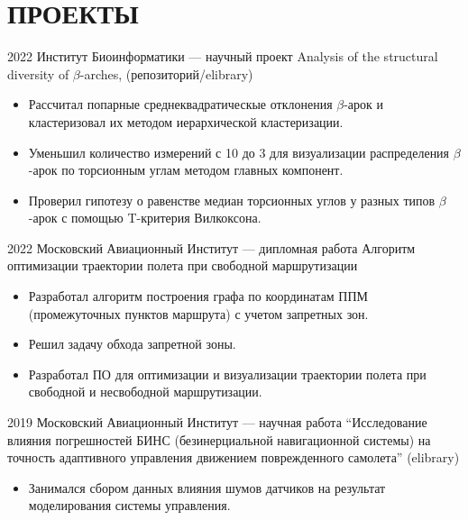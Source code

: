 \section{ПРОЕКТЫ}

    \project
    {2022}
    {Институт Биоинформатики — научный проект}
    {Analysis of the structural diversity of $\beta$-arches, (репозиторий/elibrary)}
    {
        \begin{itemize}
            \setlength\itemsep{-.5em}
            \item Рассчитал попарные среднеквадратическые отклонения $\beta$-арок и кластеризовал их методом иерархической кластеризации.
            \item Уменьшил количество измерений с 10 до 3 для визуализации распределения $\beta$-арок по торсионным углам методом главных компонент.
            \item Проверил гипотезу о равенстве медиан торсионных углов у разных типов $\beta$-арок с помощью T-критерия Вилкоксона.
        \end{itemize}
    }
    
    \project
    {2022}
    {Московский Авиационный Институт — дипломная работа}
    {Алгоритм оптимизации траектории полета при свободной маршрутизации}
    {
        \begin{itemize}
            \setlength\itemsep{-.5em}
            \item Разработал алгоритм построения графа по координатам ППМ (промежуточных пунктов маршрута) с учетом запретных зон.
            \item Решил задачу обхода запретной зоны.
            \item Разработал ПО для оптимизации и визуализации траектории полета при свободной и несвободной маршрутизации.
        \end{itemize}
    }
    
    \project
    {2019}
    {Московский Авиационный Институт — научная работа}
    {“Исследование влияния погрешностей БИНС (безинерциальной навигационной системы) на точность адаптивного управления движением поврежденного самолета” (elibrary)}
    {
        \begin{itemize}
            \setlength\itemsep{-.5em}
            \item Занимался сбором данных влияния шумов датчиков на результат моделирования системы управления.
        \end{itemize}
    }
